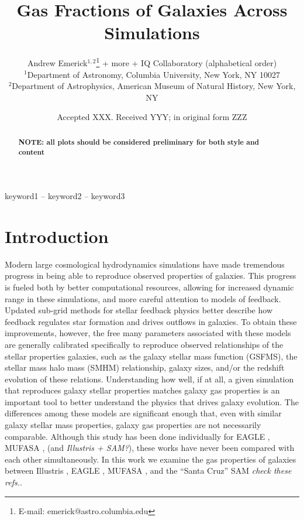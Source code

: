 \documentclass[fleqn,usenatbib]{mnras}
\title{Gas Fractions of Galaxies Across Simulations}
\author[Emerick]{ Andrew Emerick$^{1,2}$\thanks{E-mail: emerick@astro.columbia.edu} + more + IQ Collaboratory (alphabetical order)
\\
$^{1}$Department of Astronomy, Columbia University, New York, NY 10027 \\
$^{2}$Department of Astrophysics, American Museum of Natural History, New York, NY
}
\date{Accepted XXX. Received YYY; in original form ZZZ}
\begin{document}
\label{firstpage}
\pagerange{\pageref{firstpage}--\pageref{lastpage}}
\maketitle

\begin{abstract}
{\bf NOTE: all plots should be considered preliminary for both style and content}
\end{abstract}

\begin{keywords}
keyword1 -- keyword2 -- keyword3
\end{keywords}



\section{Introduction}



Modern large cosmological hydrodynamics simulations have made tremendous progress in being able to reproduce observed properties of galaxies. This progress is fueled both by better computational resources, allowing for increased dynamic range in these simulations, and more careful attention to models of feedback. Updated sub-grid methods for stellar feedback physics better describe how feedback regulates star formation and drives outflows in galaxies. To obtain these improvements, however, the free many parameters associated with these models are generally calibrated specifically to reproduce observed relationships of the stellar properties galaxies, such as the galaxy stellar mass function (GSFMS), the stellar mass halo mass (SMHM) relationship, galaxy sizes, and/or the redshift evolution of these relations. Understanding how well, if at all, a given simulation that reproduces galaxy stellar properties matches galaxy gas properties is an important tool to better understand the physics that drives galaxy evolution. The differences among these models are significant enough that, even with similar galaxy stellar mass properties, galaxy gas properties are not necessarily comparable. Although this study has been done individually for EAGLE \citep{Bahe2016,Marasco2016,Crain2017}, MUFASA \citep{Dave2017}, (and {\it Illustris + SAM?}), these works have never been compared with each other simultaneously. In this work we examine the gas properties of galaxies between Illustris \citep{Vogelsberger2014,Genel2014}, EAGLE \citep{Schaye2015,Crain2015}, MUFASA \citep{Dave2016}, and the ``Santa Cruz'' SAM \citep{Somerville2012,Porter2014} {\it check these refs.}.
\end{document}
